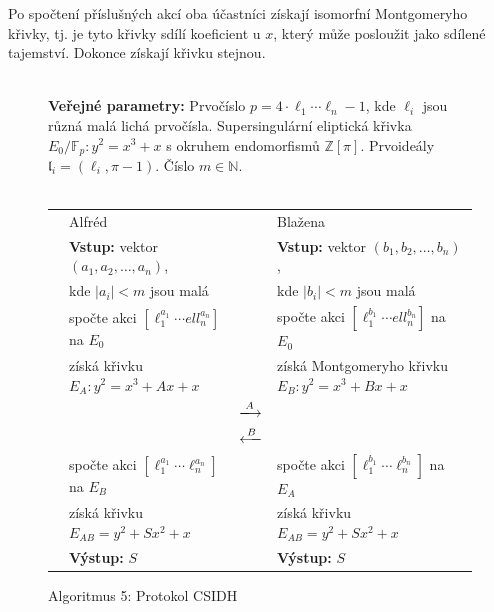 \documentclass[12pt]{report}
\begin{document}
\begin{figure}[h]
\begin{center} 
\end{center}
\end{figure}

Po spočtení příslušných akcí oba účastníci získají isomorfní Montgomeryho křivky, tj. je tyto křivky sdílí koeficient u $x$, který může posloužit jako sdílené tajemství. Dokonce získají křivku stejnou.

\begin{figure}[h]
\begin{center} 
\makebox[1cm]{\rule{17.3cm}{0.4pt}}\\
\hspace{-1.35cm} \textbf{Veřejné parametry:} Prvočíslo $p = 4 \cdot \ell_1 \cdots \ell_n - 1$, kde $\ell_i$ jsou různá malá lichá prvočísla. Supersingulární eliptická křivka $E_0/\mathbb{F}_p : y^2 = x^3+x$ s okruhem endomorfismů $\mathbb{Z}[\pi]$. Prvoideály $\mathfrak{l}_i = (\ell_i, \pi - 1)$. Číslo $m \in \mathbb{N}$.\\

\vspace{-0.25cm}
\makebox[\linewidth]{\rule{17.3cm}{0.4pt}}\\
\vspace{0.2cm}
\hspace*{-1cm}\begin{tabular}{l l c l}
 \cline{2-2} \cline{4-4} 
& Alfréd & & Blažena \\ 
\cline{2-2} \cline{4-4} 
& \textbf{Vstup:} vektor $(a_1,a_2,\dots,a_n)$,  & &  \textbf{Vstup:} vektor $(b_1,b_2,\dots,b_n)$,\\
&kde $\vert a_i \vert < m$ jsou malá & &kde $\vert b_i \vert < m$ jsou malá\\
&spočte akci $[\ell_1 ^{a_1}\cdots ell_n ^{a_n}]$ na $E_0$ & &spočte akci $[\ell_1 ^{b_1} \cdots ell_n ^{b_n}]$ na $E_0$\\
&získá křivku $E_A : y^2 = x^3 + Ax + x$& &získá Montgomeryho křivku $E_B: y^2 = x^3 + Bx + x$\\
 & & $\xlongrightarrow{A}$  &  \\
&  & $\xlongleftarrow{B} $ &  \\
& spočte akci $[\ell_1 ^{a_1} \cdots \ell_n ^{a_n}]$ na $E_B$ & & spočte akci $[\ell_1 ^{b_1} \cdots \ell_n ^{b_n}]$ na $E_A$\\
& získá křivku $E_{AB} = y^2 + Sx^2 + x$ &  & získá křivku $E_{AB} = y^2 + Sx^2 + x$ \\
& \textbf{Výstup:} $S$ & & \textbf{Výstup:} $S$
\end{tabular}
\caption*{Algoritmus 5: Protokol CSIDH}
\end{center}
\end{figure}
\end{document}
